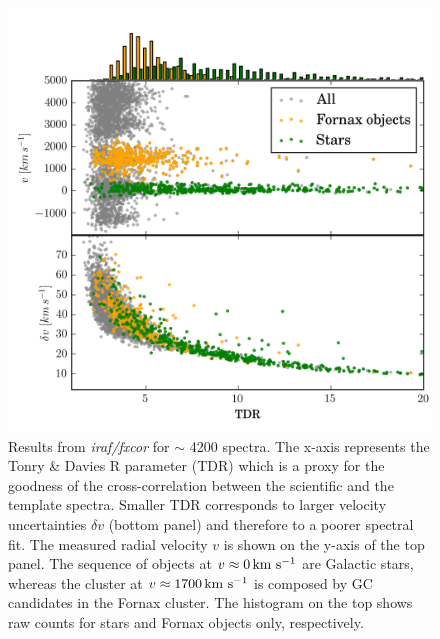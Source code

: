 \documentclass[useAMS,usenatbib]{mn2e}
\newcommand{\kms}{\mbox{\,km~s$^{-1}$}}
\begin{document}
\begin{figure}
\centering
\includegraphics[width=\columnwidth]{figures/fxcor_subplot.png} 
\caption{Results from {\it iraf/fxcor} for $\sim$ 4200 spectra. The x-axis 
represents the Tonry \& Davies R parameter (TDR) which is a proxy for the 
goodness of the cross-correlation between the scientific and the template 
spectra. Smaller TDR corresponds to larger velocity uncertainties $\delta v$ 
(bottom panel) and therefore to a poorer spectral fit. The measured radial 
velocity $v$ is shown on the y-axis of the top panel. The sequence of objects 
at $v\approx 0 \kms$ are Galactic stars, whereas the cluster at 
$v\approx1700\kms$ is composed by GC candidates in the Fornax cluster. The histogram on 
the top shows raw counts for stars and Fornax objects only, respectively. }
\label{fig:tdr}
\end{figure}
\end{document}
